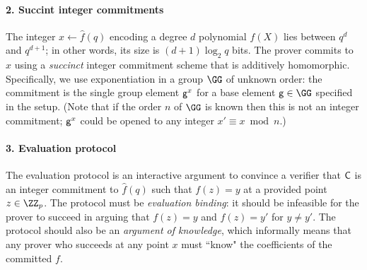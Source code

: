 \paragraph{2. Succint integer commitments}
The integer $x \leftarrow \hat{f}(q)$ encoding a degree $d$ polynomial $f(X)$ lies between $q^d$ and $q^{d+1}$; in other words, its size is $(d+1) \log_2 q$ bits. The prover commits to $x$ using a \emph{succinct} integer commitment scheme that is additively homomorphic. Specifically, we use exponentiation in a group $\GG$ of unknown order: the commitment is the single group element $\mathsf{g}^x$ for a base element $\gr{g} \in \GG$ specified in the setup. (Note that if the order $n$ of $\GG$ is known then this is not an integer commitment; $\mathsf{g}^x$ could be opened to any integer $x' \equiv x \bmod n$.)

\begin{comment} 
The binary representation of this integer consists of $d\cdot \log_2(q)$ bits, which is about as large as the description of the polynomial itself. We therefore need a succinct cryptographic commitment\footnote{For now, we consider binding-only commitments which do not hide the committed value.} of the integer that preserves the homomorphic properties of the polynomial encoding. For this purpose we use exponentiation in a group of unknown order: $\ZZ \rightarrow \mathbb{G}, x \mapsto \gr{C} = \gr{g}^x$ for some random but fixed group element $\gr{g}$. As the order is unknown in these groups, the prover cannot reduce $x\in\ZZ$ and cannot learn a different integer discrete logarithm between $\gr{g}$ and $\gr{C}$. 
The commitment is succinct as the size of group elements in $\GG$ such as $\gr{g}^x$ is just determined by a security parameter.
This commitment function is also homomorphic, \emph{i.e.}, $\gr{g}^x\cdot \gr{g}^y=\gr{g}^{x+y}$, and thus preserves the homomorphic properties of the integer encoding of polynomials.
\end{comment}

\paragraph{3. Evaluation protocol}
The evaluation protocol is an interactive argument to convince a verifier that $\mathsf{C}$ is an integer commitment to $\hat{f}(q)$ such that $f(z) = y$ at a provided point $z \in \ZZ_p$. The protocol must be \emph{evaluation binding}: it should be infeasible for the prover to succeed in arguing that $f(z) = y$ and $f(z) = y'$ for $y \neq y'$. The protocol should also be an \emph{argument of knowledge}, which informally means that any prover who succeeds at any point $x$ must ``know" the coefficients of the committed $f$. 


